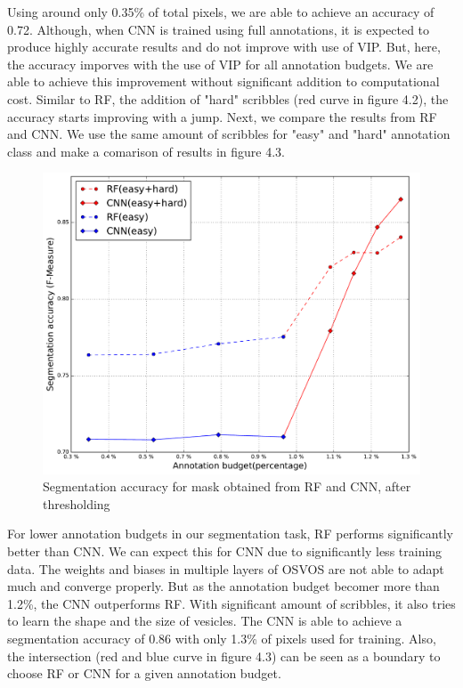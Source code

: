 Using around only 0.35\% of total pixels, we are able to achieve an accuracy of 0.72.
Although, when CNN is trained using full annotations, it is expected to produce highly accurate results and do not improve with use of VIP. But, here, the accuracy imporves with the use of VIP for all annotation budgets. We are able to achieve this improvement without significant addition to computational cost. Similar to RF, the addition of "hard" scribbles (red curve in figure 4.2), the accuracy starts improving with a jump. Next, we compare the results from RF and CNN. We use the same amount of scribbles for "easy" and "hard" annotation class and make a comarison of results in figure 4.3.  

\begin{figure}[h!] \label{fig:cnnvip}
\centering
 \includegraphics[width=0.8\linewidth]{figures/cnn_vs_rf.pdf} 
\caption{Segmentation accuracy for mask obtained from RF and CNN, after thresholding}
\end{figure}

For lower annotation budgets in our segmentation task, RF performs significantly better than CNN. We can expect this for CNN due to significantly less training data. The weights and biases in multiple layers of OSVOS are not able to adapt much and converge properly. But as the annotation budget becomer more than 1.2\%, the CNN outperforms RF. With significant amount of scribbles, it also tries to learn the shape and the size of vesicles. The CNN is able to achieve a segmentation accuracy of 0.86 with only 1.3\% of pixels used for training. Also, the intersection (red and blue curve in figure 4.3) can be seen as a boundary to choose RF or CNN for a given annotation budget. \par

